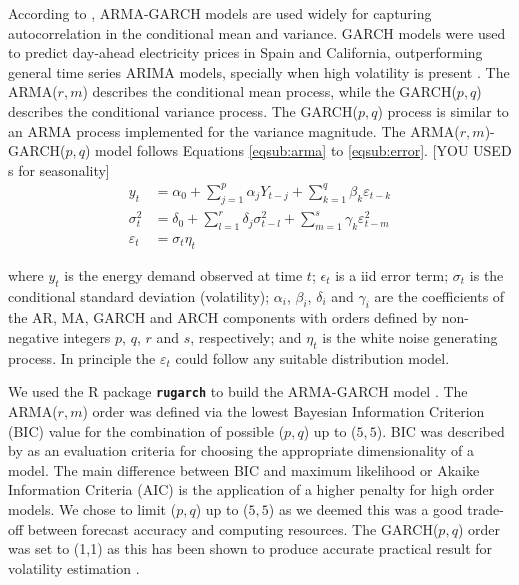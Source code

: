\documentclass[preprint,3p,12pt,authoryear]{elsarticle}
\begin{document}
According to \citet{Jeon2016991}, ARMA-GARCH models are used widely for capturing autocorrelation in the conditional mean and variance.
GARCH models were used to predict day-ahead electricity prices in Spain and California, outperforming general time series ARIMA models, specially when high volatility is present \citep{garcia2005garch}.
The ARMA($r,m$) describes the conditional mean process, while the GARCH($p,q$) describes the conditional variance process.
The GARCH($p,q$) process is similar to an ARMA process implemented for the variance magnitude.
The ARMA($r,m$)-GARCH($p,q$) model follows Equations \ref{eqsub:arma} to \ref{eqsub:error}.
[YOU USED s for seasonality]
\begin{subequations}
   \begin{align}
      y_t        & = \alpha_0 + \sum_{j=1}^p \alpha_j Y_{t-j} + \sum_{k=1}^q \beta_k \varepsilon_{t-k}
         \label{eqsub:arma} \\
      \sigma^2_t & = \delta_0 + \sum_{l=1}^r \delta_j \sigma^2_{t-l} + \sum_{m=1}^s \gamma_k \varepsilon^2_{t-m}
         \label{eqsub:garch}\\
      \varepsilon_t & = \sigma_t \eta_t
         \label{eqsub:error}
   \end{align}
   \label{eq:arma_garch}
\end{subequations}

where $y_t$ is the energy demand observed at time $t$;
$\epsilon_t$ is a iid error term;
$\sigma_t$ is the conditional standard deviation (volatility);
$\alpha_i$, $\beta_i$, $\delta_i$ and $\gamma_i$ are the coefficients of the AR, MA, GARCH and ARCH components with orders defined by non-negative integers $p$, $q$, $r$ and $s$, respectively;
and $\eta_t$ is the white noise generating process.
In principle the $\varepsilon_t$ could follow any suitable distribution model.

We used the R package \texttt{\textbf{rugarch}} to build the ARMA-GARCH model \citep{Ghalanos_2014}.
The ARMA($r,m$) order was defined via the lowest Bayesian Information Criterion (BIC) value for the combination of possible ($p,q$) up to ($5,5$).
BIC was described by \citet{schwarz1978} as an evaluation criteria for choosing the appropriate dimensionality of a model.
The main difference between BIC and maximum likelihood or Akaike Information Criteria (AIC) is the application of a higher penalty for high order models.
We chose to limit ($p,q$) up to ($5,5$) as we deemed this was a good trade-off between forecast accuracy and computing resources.
The GARCH($p,q$) order was set to (1,1) as this has been shown to produce accurate practical result for volatility estimation \citep{hansen2001comparison}.
\end{document}
